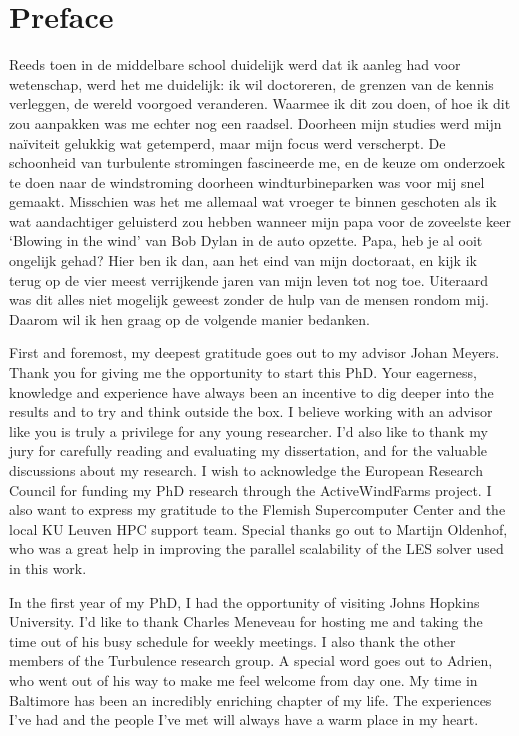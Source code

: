 \chapter*{Preface}                                  \label{ch:preface}

Reeds toen in de middelbare school duidelijk werd dat ik aanleg had voor wetenschap, werd het me duidelijk: ik wil doctoreren, de grenzen van de kennis verleggen, de wereld voorgoed veranderen. Waarmee ik dit zou doen, of hoe ik dit zou aanpakken was me echter nog een raadsel. Doorheen mijn studies werd mijn na\"iviteit gelukkig wat getemperd, maar mijn focus werd verscherpt. De schoonheid van turbulente stromingen fascineerde me, en de keuze om onderzoek te doen naar de windstroming doorheen windturbineparken was voor mij snel gemaakt. Misschien was het me allemaal wat vroeger te binnen geschoten als ik wat aandachtiger geluisterd zou hebben wanneer mijn papa voor de zoveelste keer `Blowing in the wind' van Bob Dylan in de auto opzette. Papa, heb je al ooit ongelijk gehad? Hier ben ik dan, aan het eind van mijn doctoraat, en kijk ik terug op de vier meest verrijkende jaren van mijn leven tot nog toe. Uiteraard was dit alles niet mogelijk geweest zonder de hulp van de mensen rondom mij. Daarom wil ik hen graag op de volgende manier bedanken.

First and foremost, my deepest gratitude goes out to my advisor Johan Meyers. Thank you for giving me the opportunity to start this PhD. 
Your eagerness, knowledge and experience have always been an incentive to dig deeper into the results and to try and think outside the box. I believe working with an advisor like you is truly a privilege for any young researcher. I'd also like to thank my jury for carefully reading and evaluating my dissertation, and for the valuable discussions about my research. I wish to acknowledge the European Research Council for funding my PhD research through the ActiveWindFarms project. I also want to express my gratitude to the Flemish Supercomputer Center and the local KU Leuven HPC support team. Special thanks go out to Martijn Oldenhof, who was a great help in improving the parallel scalability of the LES solver used in this work.

In the first year of my PhD, I had the opportunity of visiting Johns Hopkins University. I'd like to thank Charles Meneveau for hosting me and taking the time out of his busy schedule for weekly meetings. I also thank the other members of the Turbulence research group. A special word goes out to Adrien, who went out of his way to make me feel welcome from day one. My time in Baltimore has been an incredibly enriching chapter of my life. The experiences I've had and the people I've met will always have a warm place in my heart. 

